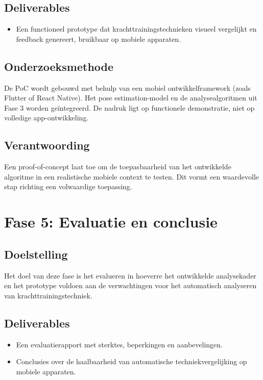\subsection{Deliverables}
\begin{itemize}
    \item Een functioneel prototype dat krachttrainingstechnieken visueel vergelijkt en feedback genereert, bruikbaar op mobiele apparaten.
\end{itemize}

\subsection{Onderzoeksmethode}
De PoC wordt gebouwd met behulp van een mobiel ontwikkelframework (zoals Flutter of React Native). 
Het pose estimation-model en de analysealgoritmen uit Fase 3 worden geïntegreerd. 
De nadruk ligt op functionele demonstratie, niet op volledige app-ontwikkeling.

\subsection{Verantwoording}
Een proof-of-concept laat toe om de toepasbaarheid van het ontwikkelde algoritme in een realistische mobiele context te testen. 
Dit vormt een waardevolle stap richting een volwaardige toepassing.

\section{Fase 5: Evaluatie en conclusie}
\subsection{Doelstelling}
Het doel van deze fase is het evalueren in hoeverre het ontwikkelde analysekader en het prototype voldoen aan de verwachtingen voor het automatisch analyseren van krachttrainingstechniek.

\subsection{Deliverables}
\begin{itemize}
    \item Een evaluatierapport met sterktes, beperkingen en aanbevelingen.
    \item Conclusies over de haalbaarheid van automatische techniekvergelijking op mobiele apparaten.
\end{itemize}

